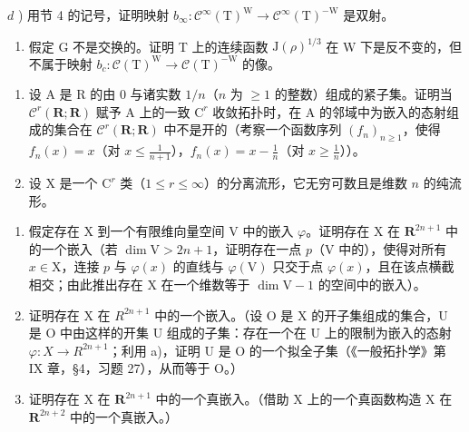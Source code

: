 \begin{enumerate}
\(d\) ) 用节 4 的记号，证明映射 \(b_{\infty}:\mathcal{C}^{\infty}(\mathrm{T})^{\mathrm{W}}\to \mathcal{C}^{\infty}(\mathrm{T})^{-\mathrm{W}}\) 是双射。

\begin{enumerate}
\def\labelenumi{\arabic{enumi})}
\setcounter{enumi}{5}
\item
  假定 G 不是交换的。证明 T 上的连续函数 \(\mathrm{J}(\rho)^{1/3}\) 在 W 下是反不变的，但不属于映射 \(b_{c}: \mathcal{C}(\mathrm{T})^{\mathrm{W}} \to \mathcal{C}(\mathrm{T})^{-\mathrm{W}}\) 的像。
\end{enumerate}


\begin{enumerate}
\def\labelenumi{\arabic{enumi})}
\item
  设 A 是 R 的由 0 与诸实数 \(1/n\)（\(n\) 为 \(\geq 1\) 的整数）组成的紧子集。证明当 \(\mathcal{C}^r(\mathbf{R};\mathbf{R})\) 赋予 A 上的一致 \(\mathrm{C}^r\) 收敛拓扑时，在 A 的邻域中为嵌入的态射组成的集合在 \(\mathcal{C}^r(\mathbf{R};\mathbf{R})\) 中不是开的（考察一个函数序列 \((f_n)_{n\geq 1}\)，使得 \(f_n(x) = x\)（对 \(x\leq \frac{1}{n + 1}\)），\(f_n(x) = x - \frac{1}{n}\)（对 \(x\geq \frac{1}{n}\)））。\\
\item
  设 X 是一个 \(\mathrm{C}^r\) 类（\(1\leq r\leq \infty\)）的分离流形，它无穷可数且是维数 \(n\) 的纯流形。
\end{enumerate}

\begin{enumerate}
\def\labelenumi{\alph{enumi})}
\item
  假定存在 X 到一个有限维向量空间 V 中的嵌入 \(\varphi\)。证明存在 X 在 \(\mathbf{R}^{2n + 1}\) 中的一个嵌入（若 \(\dim \mathrm{V} > 2n + 1\)，证明存在一点 \(p\)（V 中的），使得对所有 \(x \in \mathrm{X}\)，连接 \(p\) 与 \(\varphi(x)\) 的直线与 \(\varphi(\mathrm{V})\) 只交于点 \(\varphi(x)\)，且在该点横截相交；由此推出存在 X 在一个维数等于 \(\dim \mathrm{V} - 1\) 的空间中的嵌入）。
\item
  证明存在 X 在 \(R^{2n+1}\) 中的一个嵌入。（设 O 是 X 的开子集组成的集合，U 是 O 中由这样的开集 U 组成的子集：存在一个在 U 上的限制为嵌入的态射 \(\varphi: X \to R^{2n+1}\)；利用 a)，证明 U 是 O 的一个拟全子集（《一般拓扑学》第 IX 章，§4，习题 27），从而等于 O。）
\item
  证明存在 X 在 \(\mathbf{R}^{2n + 1}\) 中的一个真嵌入。（借助 X 上的一个真函数构造 X 在 \(\mathbf{R}^{2n + 2}\) 中的一个真嵌入。）
\end{enumerate}


\end{enumerate}
